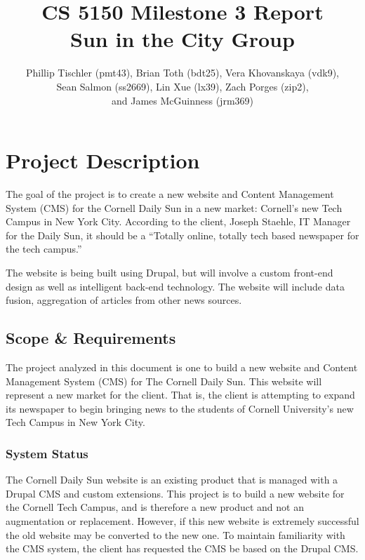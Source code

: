 \documentclass[12pt]{article} %
\title{CS 5150 Milestone 3 Report \\ Sun in the City Group}
\author{Phillip Tischler (pmt43), Brian Toth (bdt25), Vera Khovanskaya (vdk9), \\ 
Sean Salmon (ss2669), Lin Xue (lx39), Zach Porges (zip2),  \\
and James McGuinness (jrm369)}
\begin{document}
\maketitle
\clearpage
\tableofcontents

\section{Project Description}

The goal of the project is to create a new website and Content Management System (CMS) for the Cornell Daily Sun in a new market: Cornell’s new Tech Campus in New York City. According to the client, Joseph Staehle, IT Manager for the Daily Sun, it should be a ``Totally online, totally tech based newspaper for the tech campus.”

The website is being built using Drupal, but will involve a custom front-end design as well as intelligent back-end technology. The website will include data fusion, aggregation of articles from other news sources.

\subsection{Scope \& Requirements}

The project analyzed in this document is one to build a new website and Content Management System (CMS) for The Cornell Daily Sun. This website will represent a new market for the client. That is, the client is attempting to expand its newspaper to begin bringing news to the students of Cornell University’s new Tech Campus in New York City.
                   
\subsubsection{System Status}
                   
The Cornell Daily Sun website is an existing product that is managed with a Drupal CMS and custom extensions. This project is to build a new website for the Cornell Tech Campus, and is therefore a new product and not an augmentation or replacement. However, if this new website is extremely successful the old website may be converted to the new one. To maintain familiarity with the CMS system, the client has requested the CMS be based on the Drupal CMS.
                   
\end{document}
